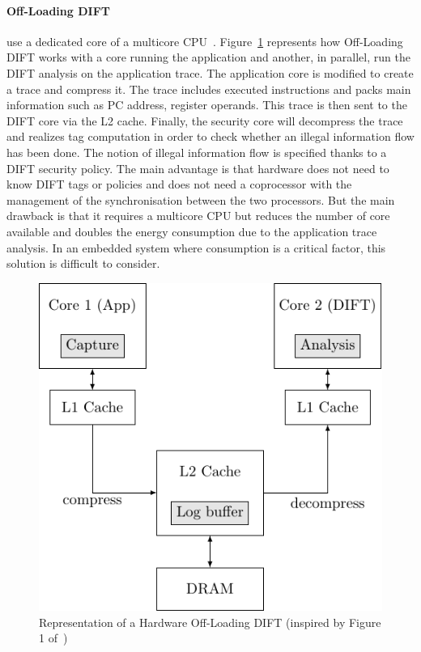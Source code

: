 \paragraph{Off-Loading DIFT} use a dedicated core of a multicore CPU~\cite{CKSFGMRRRV-08-sigarch,VHYR-08-cca,RGMRCKR-08-spaa}. Figure~\ref{fig:offloading_dift} represents how Off-Loading DIFT works with a core running the application and another, in parallel, run the DIFT analysis on the application trace. The application core is modified to create a trace and compress it. The trace includes executed instructions and packs main information such as PC address, register operands. This trace is then sent to the DIFT core via the L2 cache. Finally, the security core will decompress the trace and realizes tag computation in order to check whether an illegal information flow has been done. The notion of illegal information flow is specified thanks to a DIFT security policy.
The main advantage is that hardware does not need to know DIFT tags or policies and does not need a coprocessor with the management of the synchronisation between the two processors.  But the main drawback is that it requires a multicore CPU but reduces the number of core available and doubles the energy consumption due to the application trace analysis. In an embedded system where consumption is a critical factor, this solution is difficult to consider.

\begin{figure}[ht]
    \centering
    \includegraphics{c2_soa/img/offloading.pdf}
    \caption{Representation of a Hardware Off-Loading DIFT (inspired by Figure 1 of~\cite{KDK-09-dsn})}
    \label{fig:offloading_dift}
\end{figure}

